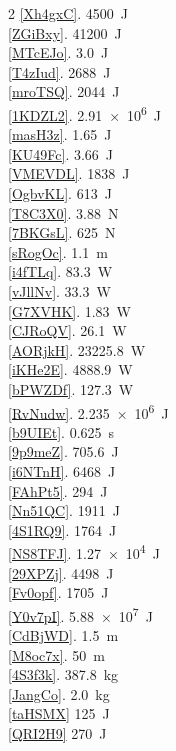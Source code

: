 \documentclass{article}
\numberwithin{equation}{section}
\numberwithin{figure}{section}
\begin{document}
\begin{multicols}{2}
\ref{Xh4gxC}. \SI{4500}{J}\\
\ref{ZGiBxy}. \SI{41200}{J}\\
\ref{MTcEJo}. \SI{3.0}{J}\\
\ref{T4zIud}. \SI{2688}{J}\\
\ref{mroTSQ}. \SI{2044}{J}\\
\ref{1KDZL2}. \SI{2.91e6}{J}\\
\ref{masH3z}. \SI{1.65}{J}\\
\ref{KU49Fc}. \SI{3.66}{J}\\
\ref{VMEVDL}. \SI{1838}{J}\\
\ref{OgbvKL}. \SI{613}{J}\\
\ref{T8C3X0}. \SI{3.88}{N}\\
\ref{7BKGsL}. \SI{625}{N}\\
\ref{sRogOc}. \SI{1.1}{m}\\
\ref{i4fTLq}. \SI{83.3}{W}\\
\ref{vJllNv}. \SI{33.3}{W}\\
\ref{G7XVHK}. \SI{1.83}{W}\\
\ref{CJRoQV}. \SI{26.1}{W}\\
\ref{AORjkH}. \SI{23225.8}{W}\\
\ref{iKHe2E}. \SI{4888.9}{W}\\
\ref{bPWZDf}. \SI{127.3}{W}\\
\ref{RvNudw}. \SI{2.235e6}{J}\\
\ref{b9UIEt}. \SI{0.625}{s}\\
\ref{9p9meZ}. \SI{705.6}{J}\\
\ref{i6NTnH}. \SI{6468}{J}\\
\ref{FAhPt5}. \SI{294}{J}\\
\ref{Nn51QC}. \SI{1911}{J}\\
\ref{4S1RQ9}. \SI{1764}{J}\\
\ref{NS8TFJ}. \SI{1.27e4}{J}\\
\ref{29XPZj}. \SI{4498}{J}\\
\ref{Fv0opf}. \SI{1705}{J}\\
\ref{Y0v7pI}. \SI{5.88e7}{J}\\
\ref{CdBjWD}. \SI{1.5}{m}\\
\ref{M8oc7x}. \SI{50}{m}\\
\ref{4S3f3k}. \SI{387.8}{kg}\\
\ref{JangCo}. \SI{2.0}{kg}\\
\ref{taHSMX} \SI{125}{J}\\
\ref{QRI2H9} \SI{270}{J}\\

\end{multicols}
\end{document}
